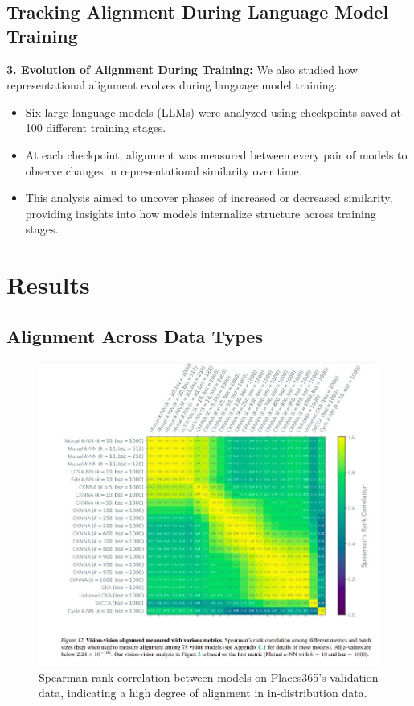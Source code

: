 \documentclass[10pt,a4paper]{article}
\begin{document}
\subsection{Tracking Alignment During Language Model Training}
\textbf{3. Evolution of Alignment During Training:} We also studied how representational alignment evolves during language model training:
\begin{itemize}
    \item Six large language models (LLMs) were analyzed using checkpoints saved at 100 different training stages.
    \item At each checkpoint, alignment was measured between every pair of models to observe changes in representational similarity over time.
    \item This analysis aimed to uncover phases of increased or decreased similarity, providing insights into how models internalize structure across training stages.
\end{itemize}

\section{Results}
\subsection{Alignment Across Data Types}
\begin{figure}[H]
    \centering
    \includegraphics[width=\textwidth]{prh_correlation.jpg}
    \caption{Spearman rank correlation between models on Places365's validation data, indicating a high degree of alignment in in-distribution data.}
    \label{fig:prh_correlation}
\end{figure}
\end{document}
